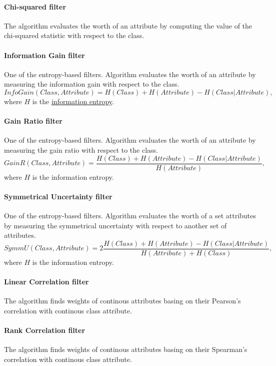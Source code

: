\documentclass[10pt]{article}\usepackage[]{graphicx}\usepackage[]{color}
\begin{document}
\paragraph{Chi-squared filter}
The algorithm evaluates the worth of an attribute by computing the value of the chi-squared statistic with respect to the class.

\paragraph{Information Gain filter}
One of the entropy-based filters. Algorithm evaluates the worth of an attribute by measuring the information gain with respect to the class.
$$InfoGain(Class, Attribute)= H(Class) +  H(Attribute) - H(Class|Attribute),$$
where $H$ is the \href{http://en.wikipedia.org/wiki/Entropy_(information_theory)}{information entropy}. 

\paragraph{Gain Ratio filter}
One of the entropy-based filters. Algorithm evaluates the worth of an attribute by measuring the gain ratio with respect to the class.
$$GainR(Class, Attribute) = \frac{H(Class) + H(Attribute) - H(Class | Attribute)}{H(Attribute)},$$
where $H$ is the information entropy. 

\paragraph{Symmetrical Uncertainty filter}
One of the entropy-based filters. Algorithm evaluates the worth of a set attributes by measuring the symmetrical uncertainty with respect to another set of attributes. 
$$SymmU(Class, Attribute)= 2\frac{H(Class) + H(Attribute) - H(Class| Attribute)}{H(Attribute) + H(Class)},$$
where $H$ is the information entropy. 

\paragraph{Linear Correlation filter}
The algorithm finds weights of continous attributes basing on their Pearson's correlation with continous class attribute.

\paragraph{Rank Correlation filter}
The algorithm finds weights of continous attributes basing on their Spearman's correlation with continous class attribute.
\end{document}
